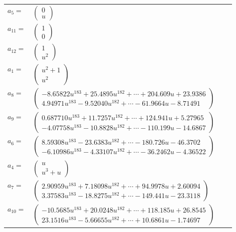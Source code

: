 \documentclass[1p]{elsarticle_modified}
\theoremstyle{definition}
\begin{document}
\begin{tabular}{m{7pt} m{180pt} m{7pt} m{180pt} }
\flushright $a_{5}=$&$\begin{pmatrix}0\\u\end{pmatrix}$ \\
\flushright $a_{11}=$&$\begin{pmatrix}1\\0\end{pmatrix}$ \\
\flushright $a_{12}=$&$\begin{pmatrix}1\\u^2\end{pmatrix}$ \\
\flushright $a_{1}=$&$\begin{pmatrix}u^2+1\\u^2\end{pmatrix}$ \\
\flushright $a_{8}=$&$\begin{pmatrix}-8.65822 u^{183}+25.4895 u^{182}+\cdots+204.609 u+23.9386\\4.94971 u^{183}-9.52040 u^{182}+\cdots-61.9664 u-8.71491\end{pmatrix}$ \\
\flushright $a_{9}=$&$\begin{pmatrix}0.687710 u^{183}+11.7257 u^{182}+\cdots+124.941 u+5.27965\\-4.07758 u^{183}-10.8828 u^{182}+\cdots-110.199 u-14.6867\end{pmatrix}$ \\
\flushright $a_{6}=$&$\begin{pmatrix}8.59308 u^{183}-23.6383 u^{182}+\cdots-180.726 u-46.3702\\-6.10986 u^{183}-4.33107 u^{182}+\cdots-36.2462 u-4.36522\end{pmatrix}$ \\
\flushright $a_{4}=$&$\begin{pmatrix}u\\u^3+u\end{pmatrix}$ \\
\flushright $a_{7}=$&$\begin{pmatrix}2.90959 u^{183}+7.18098 u^{182}+\cdots+94.9978 u+2.60094\\3.37583 u^{183}-18.8275 u^{182}+\cdots-149.441 u-23.3118\end{pmatrix}$ \\
\flushright $a_{10}=$&$\begin{pmatrix}-10.5685 u^{183}+20.0248 u^{182}+\cdots+118.185 u+26.8545\\23.1516 u^{183}-5.66655 u^{182}+\cdots+10.6861 u-1.74697\end{pmatrix}$ \\

\end{tabular}
\end{document}
